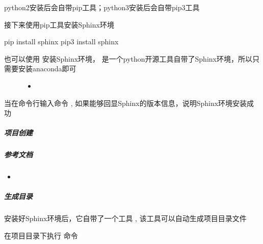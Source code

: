 \documentclass[a4paper,10pt,english]{sphinxmanual}
\begin{document}
python2安装后会自带pip工具；python3安装后会自带pip3工具

接下来使用pip工具安装Sphinx环境

\begin{sphinxVerbatim}[commandchars=\\\{\}]
\PYGZdl{} pip install sphinx
\PYGZdl{} pip3 install sphinx
\end{sphinxVerbatim}
\begin{description}
\item[{也可以使用  安装Sphinx环境，  是一个python开源工具自带了Sphinx环境，所以只需要安装anaconda即可}] \leavevmode\begin{itemize}
\item {} 

\end{itemize}

\end{description}

当在命令行输入命令  , 如果能够回显Sphinx的版本信息，说明Sphinx环境安装成功

\begin{figure}[htbp]
\centering

\noindent{}
\end{figure}


\subparagraph{项目创建}
\label{\detokenize{sphinx/1-generate/3-project::doc}}\label{\detokenize{sphinx/1-generate/3-project:id1}}

\subparagraph{参考文档}
\label{\detokenize{sphinx/1-generate/3-project:id2}}\begin{itemize}
\item {} 

\end{itemize}


\subparagraph{生成目录}
\label{\detokenize{sphinx/1-generate/3-project:id3}}
安装好Sphinx环境后，它自带了一个工具  , 该工具可以自动生成项目目录文件

在项目目录下执行  命令
\end{document}
